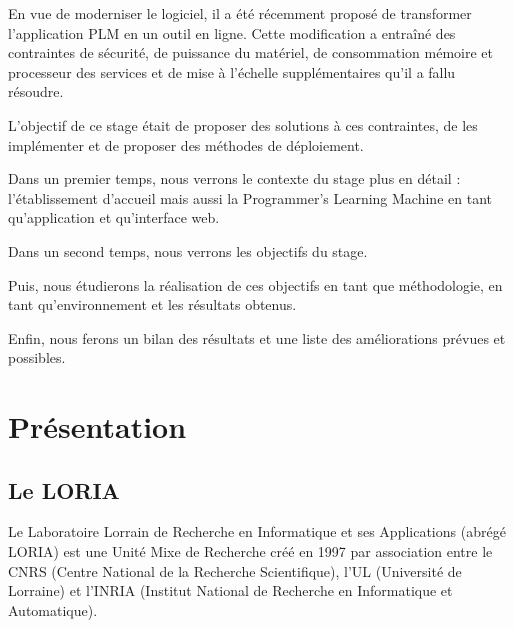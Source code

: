 \documentclass[stage]{tnreport}
\begin{document}
En vue de moderniser le logiciel, il a été récemment proposé de transformer l'application PLM en un outil en ligne. Cette modification a entraîné des contraintes de sécurité, de puissance du matériel, de consommation mémoire et processeur des services et de mise à l'échelle supplémentaires qu'il a fallu résoudre.

L'objectif de ce stage était de proposer des solutions à ces contraintes, de les implémenter et de proposer des méthodes de déploiement.

Dans un premier temps, nous verrons le contexte du stage plus en détail : l'établissement d'accueil mais aussi la Programmer's Learning Machine en tant qu'application et qu'interface web.

Dans un second temps, nous verrons les objectifs du stage.

Puis, nous étudierons la réalisation de ces objectifs en tant que méthodologie, en tant qu'environnement et les résultats obtenus.

Enfin, nous ferons un bilan des résultats et une liste des améliorations prévues et possibles.

\cleardoublepage

\chapter{Présentation}

\section{Le LORIA}

Le Laboratoire Lorrain de Recherche en Informatique et ses Applications (abrégé LORIA) est une Unité Mixe de Recherche créé en 1997 par association entre le CNRS (Centre National de la Recherche Scientifique), l'UL (Université de Lorraine) et l'INRIA (Institut National de Recherche en Informatique et Automatique).
\end{document}
